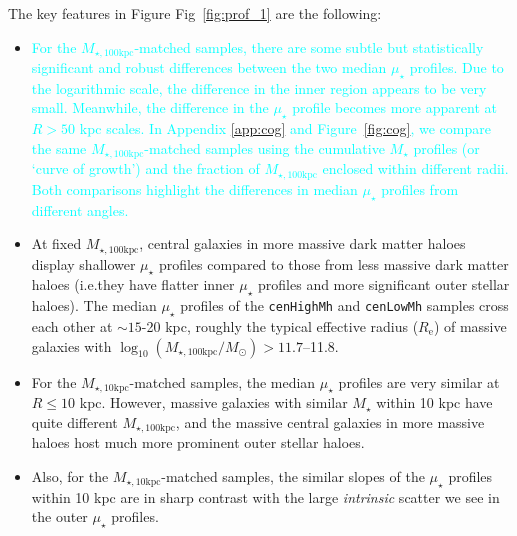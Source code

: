 \documentclass[a4paper,fleqn,usenatbib]{mnras}
\def\rbcg{\texttt{cenHighMh}}
\def\nbcg{\texttt{cenLowMh}}
\def\mstar{{$M_{\star}$}}
\def\minn{{$M_{\star,10\mathrm{kpc}}$}}
\def\mtot{{$M_{\star,100\mathrm{kpc}}$}}
\def\logmtot{{$\log_{10} (M_{\star,100\mathrm{kpc}}/M_{\odot})$}}
\def\mden{{$\mu_{\star}$}}
\newcommand{\song}[1]{\textcolor{cyan}{#1}}
\begin{document}
    The key features in Figure Fig~\ref{fig:prof_1} are the following:
    
    \begin{itemize}
        
        \item \song{
            For the \mtot{}-matched samples, there are some subtle but statistically 
            significant and robust differences between the two median \mden{} profiles.
            Due to the logarithmic scale, the difference in the inner region appears 
            to be very small. 
            Meanwhile, the difference in the \mden{} profile becomes more apparent 
            at $R>50$ kpc scales.  
            In Appendix \ref{app:cog} and Figure~\ref{fig:cog}, we compare the same
            \mtot{}-matched samples using the cumulative \mstar{} profiles 
            (or `curve of growth') and the fraction of \mtot{} enclosed within 
            different radii.
            Both comparisons highlight the differences in median \mden{} profiles 
            from different angles.
            }
            
        \item At fixed \mtot{}, central galaxies in more massive dark matter haloes 
            display shallower \mden{} profiles compared to those from less massive 
            dark matter haloes (i.e.they have flatter inner \mden{} profiles and 
            more significant outer stellar haloes). 
            The median \mden{} profiles of the \rbcg{} and \nbcg{} samples cross 
            each other at ${\sim} 15$-20 kpc, roughly the typical effective radius 
            ($R_{\mathrm{e}}$) of massive galaxies with \logmtot{}$>11.7$--11.8.      
            
        \item For the \minn{}-matched samples, the median \mden{} profiles 
            are very similar at $R \leq 10$ kpc. 
            However, massive galaxies with similar \mstar{} within 10 kpc have quite
            different \mtot{}, and the massive central galaxies in 
            more massive haloes host much more prominent outer stellar haloes. 
    
        \item Also, for the \minn{}-matched samples, the similar slopes of the 
            \mden{} profiles within 10 kpc are in sharp contrast with the large
            \textit{intrinsic} scatter we see in the outer \mden{} profiles. 
                        
    \end{itemize}
\end{document}

